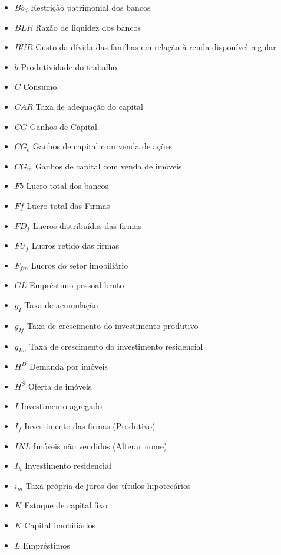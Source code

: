 \documentclass[11pt]{article}
\begin{document}
\begin{itemize}
\item
  \(Bb_d\) Restrição patrimonial dos bancos
\item
  \(BLR\) Razão de liquidez dos bancos
\item
  \(BUR\) Custo da dívida das famílias em relação à renda disponível
  regular
\item
  \(b\) Produtividade do trabalho
\item
  \(C\) Consumo
\item
  \(CAR\) Taxa de adequação do capital
\item
  \(CG\) Ganhos de Capital
\item
  \(CG_e\) Ganhos de capital com venda de ações
\item
  \(CG_m\) Ganhos de capital com venda de imóveis
\item
  \(Fb\) Lucro total dos bancos
\item
  \(Ff\) Lucro total das Firmas
\item
  \(FD_f\) Lucros distribuídos das firmas
\item
  \(FU_f\) Lucros retido das firmas
\item
  \(F_{fm}\) Lucros do setor imobiliário
\item
  \(GL\) Empréstimo pessoal bruto
\item
  \(g_I\) Taxa de acumulação
\item
  \(g_{If}\) Taxa de crescimento do investimento produtivo
\item
  \(g_{Im}\) Taxa de crescimento do investimento residencial
\item
  \(H^D\) Demanda por imóveis
\item
  \(H^S\) Oferta de imóveis
\item
  \(I\) Investimento agregado
\item
  \(I_f\) Investimento das firmas (Produtivo)
\item
  \(INL\) Imóveis não vendidos (Alterar nome)
\item
  \(I_h\) Investimento residencial
\item
  \(i_m\) Taxa própria de juros dos títulos hipotecários
\item
  \(K\) Estoque de capital fixo
\item
  \(K\) Capital imobiliários
\item
  \(L\) Empréstimos


\end{itemize}
\end{document}
